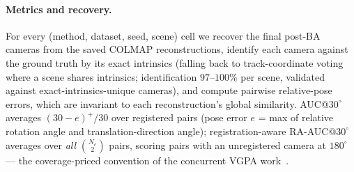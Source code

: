 \documentclass{article}
\begin{document}
\paragraph{Metrics and recovery.} For every (method, dataset, seed, scene) cell we
recover the final post-BA cameras from the saved COLMAP reconstructions, identify each
camera against the ground truth by its exact intrinsics (falling back to
track-coordinate voting where a scene shares intrinsics; identification $97$--$100\%$
per scene, validated against exact-intrinsics-unique cameras), and compute pairwise
relative-pose errors, which are invariant to each reconstruction's global similarity.
AUC@$30^{\circ}$ averages $(30-e)^{+}/30$ over registered pairs (pose error $e$ = max
of relative rotation angle and translation-direction angle); registration-aware
RA-AUC@$30^{\circ}$ averages over \emph{all} $\binom{N_c}{2}$ pairs, scoring pairs with
an unregistered camera at $180^{\circ}$ --- the coverage-priced convention of the
concurrent VGPA work~\citep{vgpa}.
\end{document}
